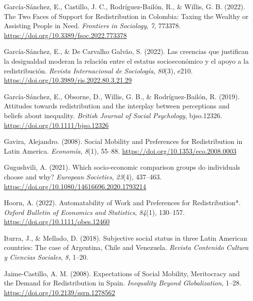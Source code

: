 \documentclass[
  12pt,
]{book}
\newlength{\cslhangindent}
\newlength{\cslentryspacingunit} %
\newenvironment{CSLReferences}[2] %
 {%
  \setlength{\parindent}{0pt}
  \ifodd #1
  \let\oldpar\par
  \def\par{\hangindent=\cslhangindent\oldpar}
  \fi
  \setlength{\parskip}{#2\cslentryspacingunit}
 }%
 {}
\begin{document}
\begin{CSLReferences}{1}{0}
\leavevmode{}%
García-Sánchez, E., Castillo, J. C., Rodríguez-Bailón, R., \& Willis, G. B. (2022). The {Two Faces} of {Support} for {Redistribution} in {Colombia}: {Taxing} the {Wealthy} or {Assisting People} in {Need}. \emph{Frontiers in Sociology}, \emph{7}, 773378. \url{https://doi.org/10.3389/fsoc.2022.773378}

\leavevmode{}%
García-Sánchez, E., \& De Carvalho Galvão, S. (2022). Las creencias que justifican la desigualdad moderan la relación entre el estatus socioeconómico y el apoyo a la redistribución. \emph{Revista Internacional de Sociología}, \emph{80}(3), e210. \url{https://doi.org/10.3989/ris.2022.80.3.21.29}

\leavevmode{}%
García-Sánchez, E., Obsorne, D., Willis, G. B., \& Rodríguez-Bailón, R. (2019). Attitudes towards redistribution and the interplay between perceptions and beliefs about inequality. \emph{British Journal of Social Psychology}, bjso.12326. \url{https://doi.org/10.1111/bjso.12326}

\leavevmode{}%
Gavira, Alejandro. (2008). Social {Mobility} and {Preferences} for {Redistribution} in {Latin America}. \emph{Economía}, \emph{8}(1), 55--88. \url{https://doi.org/10.1353/eco.2008.0003}

\leavevmode{}%
Gugushvili, A. (2021). Which socio-economic comparison groups do individuals choose and why? \emph{European Societies}, \emph{23}(4), 437--463. \url{https://doi.org/10.1080/14616696.2020.1793214}

\leavevmode{}%
Hoorn, A. (2022). Automatability of {Work} and {Preferences} for {Redistribution}*. \emph{Oxford Bulletin of Economics and Statistics}, \emph{84}(1), 130--157. \url{https://doi.org/10.1111/obes.12460}

\leavevmode{}%
Iturra, J., \& Mellado, D. (2018). Subjective social status in three {Latin American} countries: {The} case of {Argentina}, {Chile} and {Venezuela}. \emph{Revista Contenido Cultura y Ciencias Sociales}, \emph{8}, 1--20.

\leavevmode{}%
Jaime-Castillo, A. M. (2008). Expectations of {Social Mobility}, {Meritocracy} and the {Demand} for {Redistribution} in {Spain}. \emph{Inequality {Beyond Globalization}}, 1--28. \url{https://doi.org/10.2139/ssrn.1278562}


\end{CSLReferences}
\end{document}
